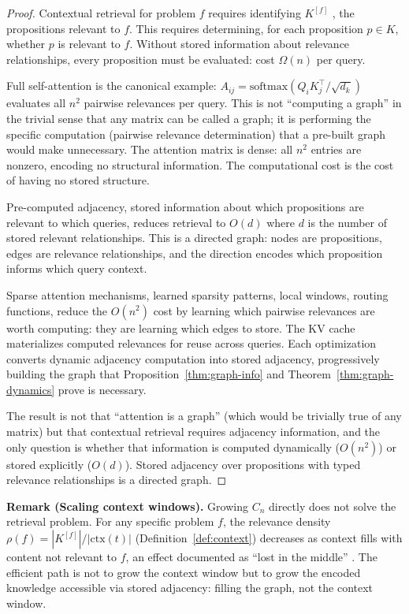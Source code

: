 \documentclass[11pt]{article}
\theoremstyle{definition}
\begin{document}
\begin{proof}
Contextual retrieval for problem $f$ requires identifying $K^{[f]}$
, the propositions relevant to $f$. This requires determining, for
each proposition $p \in K$, whether $p$ is relevant to $f$. Without
stored information about relevance relationships, every proposition must
be evaluated: cost $\Omega(n)$ per query.

Full self-attention is the canonical example:
$A_{ij} = \mathrm{softmax}(Q_i K_j^\top / \sqrt{d_k})$ evaluates all
$n^2$ pairwise relevances per query. This is not ``computing a graph''
in the trivial sense that any matrix can be called a graph; it is
performing the specific computation (pairwise relevance determination)
that a pre-built graph would make unnecessary. The attention matrix is
dense: all $n^2$ entries are nonzero, encoding no structural
information. The computational cost is the cost of having no stored
structure.

Pre-computed adjacency, stored information about which propositions
are relevant to which queries, reduces retrieval to $O(d)$ where $d$
is the number of stored relevant relationships. This is a directed
graph: nodes are propositions, edges are relevance relationships, and
the direction encodes which proposition informs which query context.

Sparse attention mechanisms, learned sparsity patterns, local
windows, routing functions, reduce the $O(n^2)$ cost by learning
which pairwise relevances are worth computing: they are learning which
edges to store. The KV cache materializes computed relevances for reuse
across queries. Each optimization converts dynamic adjacency computation
into stored adjacency, progressively building the graph that
Proposition~\ref{thm:graph-info} and Theorem~\ref{thm:graph-dynamics} prove is
necessary.

The result is not that ``attention is a graph'' (which would be
trivially true of any matrix) but that contextual retrieval requires
adjacency information, and the only question is whether that information
is computed dynamically ($O(n^2)$) or stored explicitly ($O(d)$). Stored
adjacency over propositions with typed relevance relationships is a
directed graph.
\end{proof}

\textbf{Remark (Scaling context windows).}
Growing $C_n$ directly does not solve the retrieval problem. For any
specific problem $f$, the relevance density $\rho(f) = |K^{[f]}| /
|\mathrm{ctx}(t)|$ (Definition~\ref{def:context}) decreases as context
fills with content not relevant to $f$, an effect documented
as ``lost in the middle'' \cite{Liu2024}. The efficient
path is not to grow the context window but to grow the encoded knowledge
accessible via stored adjacency: filling the graph, not the context
window.
\end{document}
